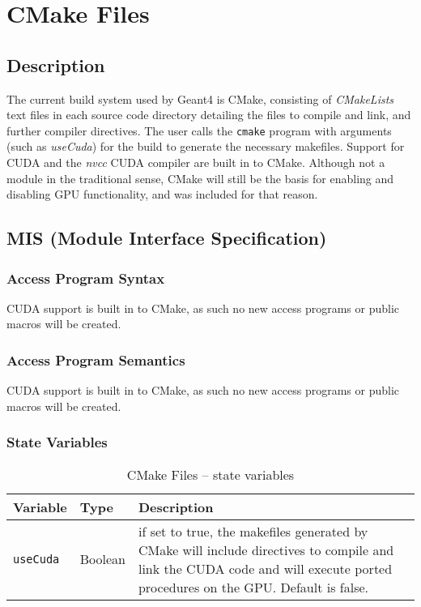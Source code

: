 \documentclass[12pt]{article}
\begin{document}
\section{CMake Files}
\subsection{Description}\label{Sec_CMakeDesc}
The current build system used by Geant4 is CMake, consisting of \emph{CMakeLists} text files in each source code directory detailing the files to compile and link, and further compiler directives. The user calls the \texttt{cmake} program with arguments (such as \emph{useCuda}) for the build to generate the necessary makefiles. Support for CUDA and the \emph{nvcc} CUDA compiler are built in to CMake. Although not a module in the traditional sense, CMake will still be the basis for enabling and disabling GPU functionality, and was included for that reason.

\subsection{MIS (Module Interface Specification)}
\subsubsection{Access Program Syntax}%
CUDA support is built in to CMake, as such no new access programs or public macros will be created.

\subsubsection{Access Program Semantics}%
CUDA support is built in to CMake, as such no new access programs or public macros will be created.

\subsubsection{State Variables}%
\begin{table}[h]
\caption{CMake Files -- state variables}\label{Table_CMakeStateVariables}
\begin{tabularx}{\textwidth}{p{}p{}p{}}
\toprule
\bf Variable & \bf Type & \bf Description\\\midrule
\texttt{useCuda} & Boolean & if set to true, the makefiles generated by CMake will include directives to compile and link the CUDA code and will execute ported procedures on the GPU. Default is false.\\
\bottomrule
\end{tabularx}
\end{table}
\end{document}
